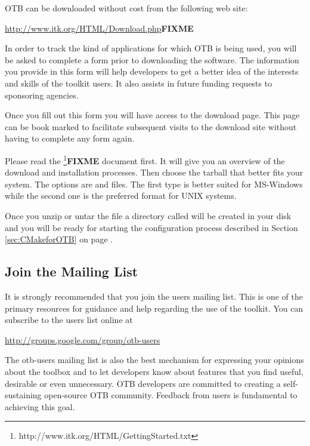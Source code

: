 
OTB can be downloaded without cost from the following web site:
\begin{center} 
  \url{http://www.itk.org/HTML/Download.php}\textbf{FIXME}
\end{center}
In order to track the kind of applications for which OTB is being used, you
will be asked to complete a form prior to downloading the software.
The information you provide in this form will help developers to get a better
idea of the interests and skills of the toolkit users. It also assists in 
future funding requests to sponsoring agencies.

Once you fill out this form you will have access to the download
page. This page can be
book marked to facilitate subsequent visits to the download site without
having to complete any form again.

Please read the
\footnote{http://www.itk.org/HTML/GettingStarted.txt}\textbf{FIXME}
document first. It will give you an overview of the download and installation
processes. Then choose the tarball that better fits your system. The options
are  and  files.  The first type is better suited for
MS-Windows while the second one is the preferred format for UNIX systems.

Once you unzip or untar the file a directory called  will be
created in your disk and you will be ready for starting the configuration
process described in Section \ref{sec:CMakeforOTB} on page 
\pageref{sec:CMakeforOTB}.


\subsection{Join the Mailing List}
\label{sec:JoinMailList}


It is strongly recommended that you join the users mailing list. This is one
of the primary resources for guidance and help regarding the use of the 
toolkit. You can subscribe to the users list online at

\begin{center}
\url{http://groups.google.com/group/otb-users}
\end{center} 

The otb-users mailing list is also the best mechanism for expressing your
opinions about the toolbox and to let developers know about features that you
find useful, desirable or even unnecessary. OTB developers are committed to
creating a self-sustaining open-source OTB community. Feedback from users is
fundamental to achieving this goal.

